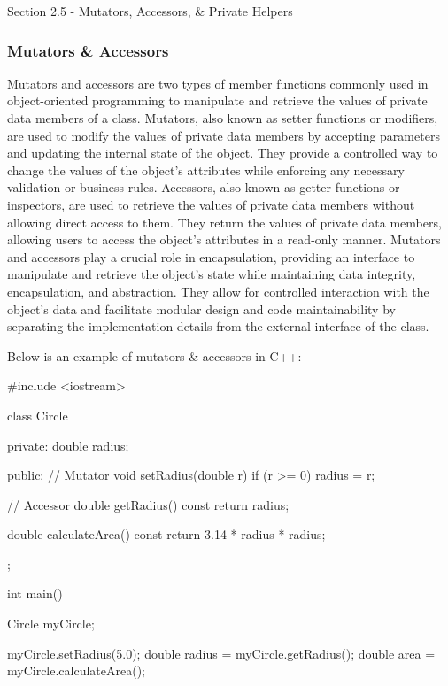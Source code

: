\begin{notes}{Section 2.5 - Mutators, Accessors, \& Private Helpers}
    \subsubsection*{Mutators \& Accessors}

    Mutators and accessors are two types of member functions commonly used in object-oriented programming to manipulate and retrieve the values of private data members of a class. Mutators, also known as setter functions or 
    modifiers, are used to modify the values of private data members by accepting parameters and updating the internal state of the object. They provide a controlled way to change the values of the object's attributes while 
    enforcing any necessary validation or business rules. Accessors, also known as getter functions or inspectors, are used to retrieve the values of private data members without allowing direct access to them. They return 
    the values of private data members, allowing users to access the object's attributes in a read-only manner. Mutators and accessors play a crucial role in encapsulation, providing an interface to manipulate and retrieve 
    the object's state while maintaining data integrity, encapsulation, and abstraction. They allow for controlled interaction with the object's data and facilitate modular design and code maintainability by separating the 
    implementation details from the external interface of the class.
    
    \begin{highlight}
        Below is an example of mutators \& accessors in C++:
    \begin{code}[C++]
    #include <iostream>

    class Circle {
    private:
        double radius;
        
    public:
        // Mutator
        void setRadius(double r) {
            if (r >= 0) {
                radius = r;
            }
        }
        
        // Accessor
        double getRadius() const {
            return radius;
        }
        
        double calculateArea() const {
            return 3.14 * radius * radius;
        }
    };
    
    int main() {
        Circle myCircle;
        
        myCircle.setRadius(5.0);
        double radius = myCircle.getRadius();
        double area = myCircle.calculateArea();
        
}
\end{code}
\end{highlight}
\end{notes}
